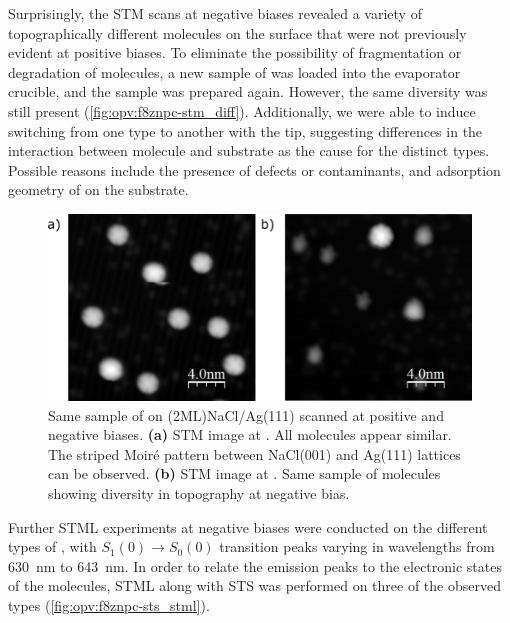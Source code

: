 
Surprisingly, the \ac{STM} scans at negative biases revealed a variety of topographically different molecules on the surface that were not previously evident at positive biases. To eliminate the possibility of fragmentation or degradation of molecules, a new sample of  was loaded into the evaporator crucible, and the sample was prepared again. However, the same diversity was still present (\autoref{fig:opv:f8znpc-stm_diff}). Additionally, we were able to induce switching from one type to another with the tip, suggesting differences in the interaction between molecule and substrate as the cause for the distinct types. Possible reasons include the presence of defects or contaminants, and adsorption geometry of  on the substrate.


\begin{figure} [H]
    \centering
    \includegraphics[width=\textwidth]{pictures/diversity.png}
    \caption{Same sample of  on (2ML)NaCl/Ag(111) scanned at positive and negative biases. \textbf{(a)} STM image at . All molecules appear similar. The striped Moir\'e pattern between NaCl(001) and Ag(111) lattices can be observed. \textbf{(b)} STM image at . Same sample of molecules showing diversity in topography at negative bias. }
    \label{fig:opv:f8znpc-stm_diff}
\end{figure}

Further \ac{STML} experiments at negative biases were conducted on the different types of , with $S_1(0) \rightarrow S_0(0)$ transition peaks varying in wavelengths from \SI{630}{nm} to \SI{643}{nm}. In order to relate the emission peaks to the electronic states of the molecules, \ac{STML} along with \ac{STS} was performed on three of the observed types (\autoref{fig:opv:f8znpc-sts_stml}). 


